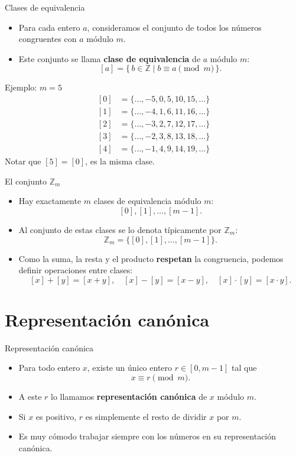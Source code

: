 \documentclass[aspectratio=169]{beamer}
\begin{document}
\begin{frame}{Clases de equivalencia}
  \begin{itemize}
    \item Para cada entero \(a\), consideramos el conjunto de todos los números congruentes con \(a\) módulo \(m\).
    \item Este conjunto se llama \textbf{clase de equivalencia} de \(a\) módulo \(m\):
      \[
        [a] = \{\, b \in \mathbb{Z} \mid b \equiv a \pmod m \,\}.
      \]
  \end{itemize}
  \begin{block}{Ejemplo: \(m = 5\)}
    \[
    \begin{aligned}
      [0] &= \{\dots, -5, 0, 5, 10, 15, \dots\}\\
      [1] &= \{\dots, -4, 1, 6, 11, 16, \dots\}\\
      [2] &= \{\dots, -3, 2, 7, 12, 17, \dots\}\\
      [3] &= \{\dots, -2, 3, 8, 13, 18, \dots\}\\
      [4] &= \{\dots, -1, 4, 9, 14, 19, \dots\}
    \end{aligned}
    \]
    Notar que \([5] = [0]\), es la misma clase.
  \end{block}
\end{frame}

\begin{frame}{El conjunto \( \mathbb{Z}_m \)}
  \begin{itemize}
    \item Hay exactamente \(m\) clases de equivalencia módulo \(m\):
      \[
        [0], [1], \dots, [m-1].
      \]
    \item Al conjunto de estas clases se lo denota típicamente por \(\mathbb{Z}_m\):
      \[
        \mathbb{Z}_m = \{ [0], [1], \dots, [m-1] \}.
      \]
    \item Como la suma, la resta y el producto \textbf{respetan} la congruencia, podemos definir operaciones entre clases:
      \[
        [x] + [y] = [x + y],\quad
        [x] - [y] = [x - y],\quad
        [x] \cdot [y] = [x \cdot y].
      \]
  \end{itemize}
\end{frame}

\section{Representación canónica}

\begin{frame}{Representación canónica}
  \begin{itemize}
    \item Para todo entero \(x\), existe un único entero \(r \in [0, m-1]\) tal que
      \[
        x \equiv r \pmod m.
      \]
    \item A este \(r\) lo llamamos \textbf{representación canónica} de \(x\) módulo \(m\).
    \item Si \(x\) es positivo, \(r\) es simplemente el resto de dividir \(x\) por \(m\).
    \item Es muy cómodo trabajar siempre con los números en su representación canónica.
  \end{itemize}
\end{frame}
\end{document}
